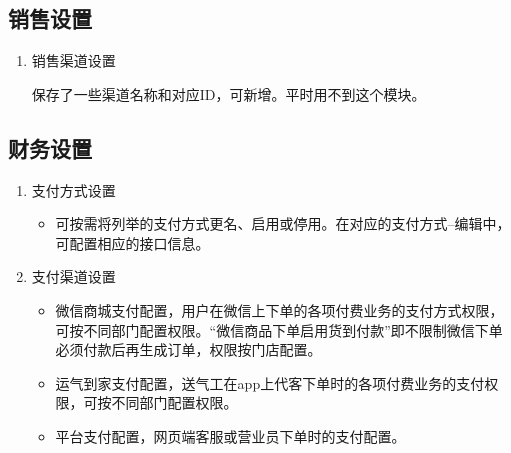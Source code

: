 \documentclass[UTF8]{ctexart}
\begin{document}
\subsection{销售设置}
\begin{enumerate}
	\item 销售渠道设置
	
	保存了一些渠道名称和对应ID，可新增。平时用不到这个模块。
\end{enumerate}


\subsection{财务设置}
\begin{enumerate}
	\item 支付方式设置
	
	\begin{itemize}
		 
	\item 可按需将列举的支付方式更名、启用或停用。在对应的支付方式--编辑中，可配置相应的接口信息。

	\end{itemize}

	\item 支付渠道设置
	\begin{itemize}
		
		\item 微信商城支付配置，用户在微信上下单的各项付费业务的支付方式权限，可按不同部门配置权限。“微信商品下单启用货到付款”即不限制微信下单必须付款后再生成订单，权限按门店配置。
		
		\item 运气到家支付配置，送气工在app上代客下单时的各项付费业务的支付权限，可按不同部门配置权限。
		
		\item 平台支付配置，网页端客服或营业员下单时的支付配置。
		
	\end{itemize}



\end{enumerate}
\end{document}

